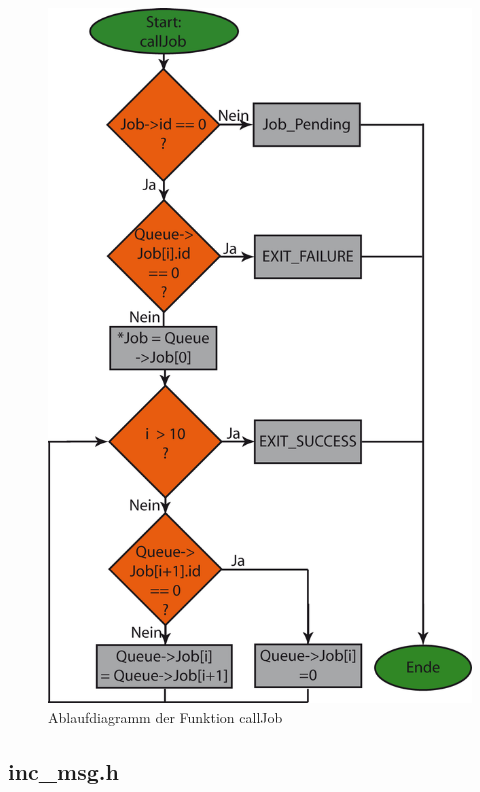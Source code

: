 \begin{figure}[h]
\includegraphics[scale = 0.8]{./callJob.png}
\hspace{-14pt}
\caption{Ablaufdiagramm der Funktion callJob}
\end{figure} 





\subsection{inc\_msg.h}







